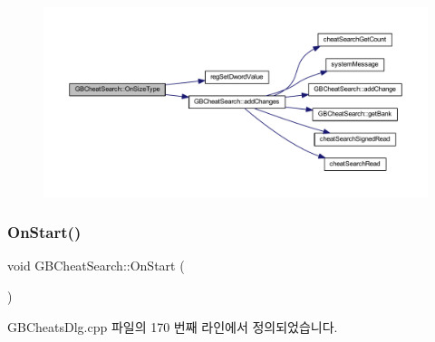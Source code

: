 \nopagebreak
\begin{figure}[H]
\begin{center}
\leavevmode
\includegraphics[width=350pt]{class_g_b_cheat_search_afd12bb730e61ef2cf06ccd22e89eb487_cgraph}
\end{center}
\end{figure}
\mbox{\label{class_g_b_cheat_search_add94032f04d4e03bee943d9a7051df20}} 
\subsubsection{\texorpdfstring{On\+Start()}{OnStart()}}
{\footnotesize\ttfamily void G\+B\+Cheat\+Search\+::\+On\+Start (\begin{DoxyParamCaption}{ }\end{DoxyParamCaption})\hspace{0.3cm}{\ttfamily [protected]}}



G\+B\+Cheats\+Dlg.\+cpp 파일의 170 번째 라인에서 정의되었습니다.



